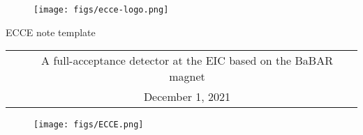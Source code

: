 \renewcommand*\familydefault{\sfdefault}
{\sffamily
\vfill
\vspace{4cm}
\begin{figure}[H]
  \begin{center}
  \texttt{[image: figs/ecce-logo.png]}
\end{center}
\end{figure}

\begin{center}
  \large
  {\LARGE{ECCE note template}}

  \begin{tabular}{cc}
&A full-acceptance detector at the EIC based on the BaBAR magnet \\
&December 1, 2021 \\
  \end{tabular}
  \end{center}

\vspace{1cm}

\begin{figure}[H]
  \begin{center}
    \texttt{[image: figs/ECCE.png]}
  \end{center}
\end{figure}
}


\vfill
\renewcommand*\familydefault{\rmdefault}
